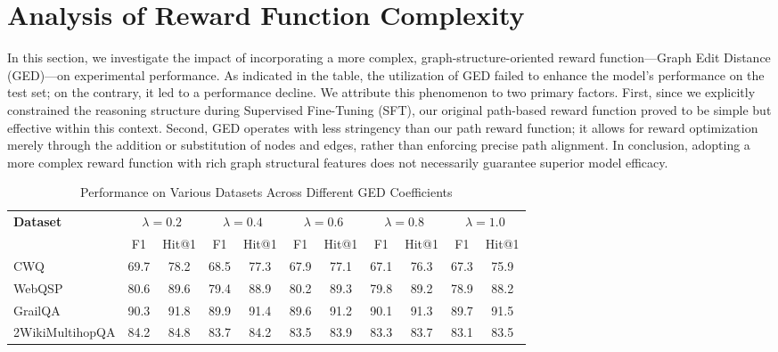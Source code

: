 \section{Analysis of Reward Function Complexity}


In this section, we investigate the impact of incorporating a more complex, graph-structure-oriented reward function—Graph Edit Distance (GED)—on experimental performance. As indicated in the table, the utilization of GED failed to enhance the model's performance on the test set; on the contrary, it led to a performance decline. We attribute this phenomenon to two primary factors. First, since we explicitly constrained the reasoning structure during Supervised Fine-Tuning (SFT), our original path-based reward function proved to be simple but effective within this context. Second, GED operates with less stringency than our path reward function; it allows for reward optimization merely through the addition or substitution of nodes and edges, rather than enforcing precise path alignment. In conclusion, adopting a more complex reward function with rich graph structural features does not necessarily guarantee superior model efficacy.

\begin{table}[htbp]
    \centering
   
    \setlength{\tabcolsep}{2pt}
    \caption{Performance on Various Datasets Across Different GED Coefficients}
    \label{tab:ged_performance_fix}
    
    
    \begin{tabular}{l *{10}{c}}
        \toprule
       
        \multirow{2}{*}{\textbf{Dataset}} & 
        \multicolumn{2}{c}{$\lambda=0.2$} & 
        \multicolumn{2}{c}{$\lambda=0.4$} & 
        \multicolumn{2}{c}{$\lambda=0.6$} & 
        \multicolumn{2}{c}{$\lambda=0.8$} & 
        \multicolumn{2}{c}{$\lambda=1.0$} \\
        \cmidrule(lr){2-3} \cmidrule(lr){4-5} \cmidrule(lr){6-7} \cmidrule(lr){8-9} \cmidrule(lr){10-11}
        
        & F1 & Hit@1 & F1 & Hit@1 & F1 & Hit@1 & F1 & Hit@1 & F1 & Hit@1 \\
        \midrule
       
        CWQ & 69.7 & 78.2 & 68.5 & 77.3 & 67.9 & 77.1 & 67.1 & 76.3 & 67.3 & 75.9 \\
        
        WebQSP   & 80.6 & 89.6 & 79.4 & 88.9 & 80.2 & 89.3 & 79.8 & 89.2 & 78.9 & 88.2 \\
        
        GrailQA & 90.3 & 91.8 & 89.9 & 91.4 & 89.6 & 91.2 & 90.1 & 91.3 & 89.7 & 91.5 \\

        2WikiMultihopQA  & 84.2 & 84.8 & 83.7 & 84.2 & 83.5 & 83.9 & 83.3 & 83.7 & 83.1 & 83.5 \\
        \bottomrule
    \end{tabular}
\end{table}

